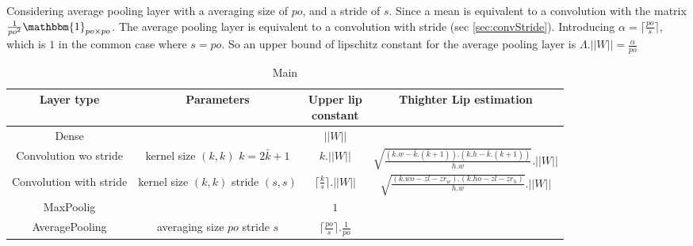 Considering average pooling layer with a averaging size of $po$, and a stride of $s$. Since a mean is equivalent to a convolution with the matrix $\frac{1}{po^2}\mathbbm{1}_{po\times po}$.
The average pooling layer is equivalent to a convolution with stride (sec \ref{sec:convStride}). Introducing $\alpha=\lceil \frac{po}{s} \rceil$, which is $1$ in the common case where $s=po$. So an upper bound of lipschitz constant for  the average pooling layer is  $\Lambda.||W||=\frac{\alpha}{po}$

\begin{table}[]
    \centering
    \begin{tabular}{|c|c|c|c|}
    \hline
       Layer type  & Parameters &\shortstack{Upper lip  \\constant}   & Thighter Lip estimation \\ \hline
       Dense & & $||W||$ & \\ \hline
       Convolution wo stride& \shortstack{kernel size $(k,k)$\\ $k=2\bar{k}+1$} & $k.||W||$ & $\sqrt{\frac{(k.w-\bar{k}.(\bar{k}+1)).(k.h-\bar{k}.(\bar{k}+1))}{h.w}}.||W||$\\\hline
       Convolution with stride &  \shortstack{kernel size $(k,k)$\\ stride $(s,s)$} & $\lceil \frac{k}{s} \rceil.||W||$ & $\sqrt{\frac{(k.wo-zl-zr_w).(k.ho-zl-zr_h)}{h.w}}.||W||$\\\hline
       MaxPoolig & & $1$ & \\\hline
       AveragePooling & \shortstack{averaging size $po$\\ stride $s$} &$\lceil \frac{po}{s} \rceil.\frac{1}{po}$ & \\ \hline
    \end{tabular}
    \caption{Main }
    \label{tab:wasserstein_estimation}
\end{table}

